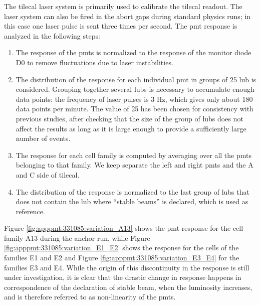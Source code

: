 The \gls{tilecal} laser system is primarily used to calibrate the \gls{tilecal} readout. 
The laser system can also be fired in the abort gaps during standard physics runs; in this case 
one laser pulse is sent three times per second.
The \gls{pmt} response is analyzed in the following steps:
\begin{enumerate}
\item The response of the \glspl{pmt} is normalized to the response of the monitor diode D0 to remove fluctuations 
due to laser instabilities.

\item The distribution of the response for each individual \gls{pmt} in groups of 25 \gls{lub} is considered. 
Grouping together several \glspl{lub} is necessary to accumulate enough data points: the frequency of laser pulses is 3 Hz, 
which gives only about 180 data points per minute. The value of 25 has been chosen for consistency with previous studies, 
after checking that the size of the group of \glspl{lub} does not affect the results 
as long as it is large enough to provide a sufficiently large number of events.

\item The response for each cell family is computed by averaging over all the \glspl{pmt} 
belonging to that family. We keep separate the left and right \glspl{pmt} and the A and C side 
of \gls{tilecal}.

\item The distribution of the response is normalized to the last group of \glspl{lub} that 
does not contain the \gls{lub} where ``stable beams'' is declared, which is used as reference.

\end{enumerate} 

Figure \ref{fig:apppmt:331085:variation_A13} shows the \gls{pmt} response for the cell family A13 during the anchor run, 
while Figure \ref{fig:apppmt:331085:variation_E1_E2} shows the response for the cells of the families E1 and E2 
and Figure \ref{fig:apppmt:331085:variation_E3_E4} for the families E3 and E4.
While the origin of this discontinuity in the response is still under investigation, it is clear that 
the drastic change in response happens in correspondence of the declaration of stable beam, when the 
luminosity increases, and is therefore referred to as non-linearity of the \glspl{pmt}. 

